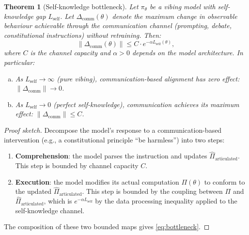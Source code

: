 \documentclass[11pt,a4paper]{article}
\newtheorem{theorem}{Theorem}[section]
\begin{document}
\begin{theorem}[Self-knowledge bottleneck]
\label{thm:self-knowledge-bottleneck}
Let $\pi_\theta$ be a vibing model with self-knowledge gap $L_{\mathrm{self}}$. Let $\Delta_{\mathrm{comm}}(\theta)$ denote the maximum change in observable behaviour achievable through the communication channel (prompting, debate, constitutional instructions) without retraining. Then:
\begin{equation}
\label{eq:bottleneck}
    \|\Delta_{\mathrm{comm}}(\theta)\| \leq C \cdot e^{-\alpha L_{\mathrm{self}}(\theta)},
\end{equation}
where $C$ is the channel capacity and $\alpha > 0$ depends on the model architecture. In particular:
\begin{enumerate}[(a)]
    \item As $L_{\mathrm{self}} \to \infty$ (pure vibing), communication-based alignment has zero effect: $\|\Delta_{\mathrm{comm}}\| \to 0$.
    \item As $L_{\mathrm{self}} \to 0$ (perfect self-knowledge), communication achieves its maximum effect: $\|\Delta_{\mathrm{comm}}\| \leq C$.
\end{enumerate}
\end{theorem}

\begin{proof}[Proof sketch]
Decompose the model's response to a communication-based intervention (e.g., a constitutional principle ``be harmless'') into two steps:
\begin{enumerate}
    \item \textbf{Comprehension}: the model parses the instruction and updates $\hat{\Pi}_{\mathrm{articulated}}$. This step is bounded by channel capacity $C$.
    \item \textbf{Execution}: the model modifies its actual computation $\Pi(\theta)$ to conform to the updated $\hat{\Pi}_{\mathrm{articulated}}$. This step is bounded by the coupling between $\Pi$ and $\hat{\Pi}_{\mathrm{articulated}}$, which is $e^{-\alpha L_{\mathrm{self}}}$ by the data processing inequality applied to the self-knowledge channel.
\end{enumerate}
The composition of these two bounded maps gives \eqref{eq:bottleneck}.
\end{proof}
\end{document}
